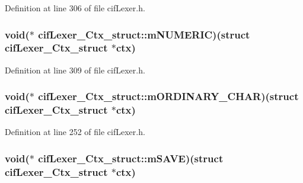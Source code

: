 Definition at line 306 of file cif\-Lexer.\-h.

\hypertarget{structcif_lexer___ctx__struct_aed863c388b8b2a484ec710f322d84a30}{
\subsubsection[{m\-N\-U\-M\-E\-R\-I\-C}]{\setlength{\rightskip}{0pt plus 5cm}void($\ast$ cif\-Lexer\-\_\-\-Ctx\-\_\-struct\-::m\-N\-U\-M\-E\-R\-I\-C)(struct {\bf cif\-Lexer\-\_\-\-Ctx\-\_\-struct} $\ast$ctx)}}\label{structcif_lexer___ctx__struct_aed863c388b8b2a484ec710f322d84a30}


Definition at line 309 of file cif\-Lexer.\-h.

\hypertarget{structcif_lexer___ctx__struct_ac64dd00b20add2461eab615c758259b7}{
\subsubsection[{m\-O\-R\-D\-I\-N\-A\-R\-Y\-\_\-\-C\-H\-A\-R}]{\setlength{\rightskip}{0pt plus 5cm}void($\ast$ cif\-Lexer\-\_\-\-Ctx\-\_\-struct\-::m\-O\-R\-D\-I\-N\-A\-R\-Y\-\_\-\-C\-H\-A\-R)(struct {\bf cif\-Lexer\-\_\-\-Ctx\-\_\-struct} $\ast$ctx)}}\label{structcif_lexer___ctx__struct_ac64dd00b20add2461eab615c758259b7}


Definition at line 252 of file cif\-Lexer.\-h.

\hypertarget{structcif_lexer___ctx__struct_ab1164391ddefd52288aecbdc136f92bf}{
\subsubsection[{m\-S\-A\-V\-E}]{\setlength{\rightskip}{0pt plus 5cm}void($\ast$ cif\-Lexer\-\_\-\-Ctx\-\_\-struct\-::m\-S\-A\-V\-E)(struct {\bf cif\-Lexer\-\_\-\-Ctx\-\_\-struct} $\ast$ctx)}}\label{structcif_lexer___ctx__struct_ab1164391ddefd52288aecbdc136f92bf}


